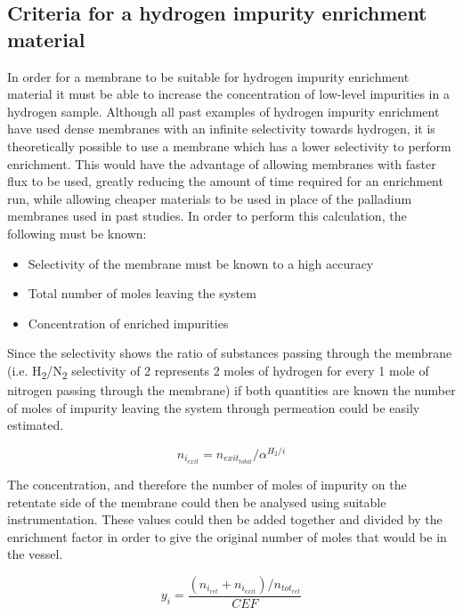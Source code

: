 \subsection{Criteria for a hydrogen impurity enrichment material}
In order for a membrane to be suitable for hydrogen impurity enrichment material it must be able to 
increase the concentration of low-level impurities in a hydrogen sample. 
Although all past examples of hydrogen impurity enrichment have used dense membranes with an infinite 
selectivity towards hydrogen, it is theoretically possible to use a membrane which has a lower selectivity 
to perform enrichment. This would have the advantage of allowing membranes with faster flux to be used, 
greatly reducing the amount of time required for an enrichment run, while allowing cheaper materials to be 
used in place of the palladium membranes used in past studies. In order to perform this calculation, 
the following must be known:
\begin{itemize}
\item Selectivity of the membrane must be known to a high accuracy
\item Total number of moles leaving the system
\item Concentration of enriched impurities
\end{itemize}

Since the selectivity shows the ratio of substances passing through the membrane 
(i.e. H\textsubscript{2}/N\textsubscript{2} selectivity of 2 represents 2 moles of hydrogen for every 1 mole 
of nitrogen passing through 
the membrane) if both quantities are known the number of moles of impurity leaving the system through 
permeation could be easily estimated.

\begin{equation}
    n_{i_{exit}} = n_{exit_{total}}/ \alpha^{H_2 /i}    
\end{equation}

The concentration, and therefore the number of moles of impurity on the retentate side of the membrane 
could then be analysed using suitable instrumentation. These values could then be added together and 
divided by the enrichment factor in order to give the original number of moles that would be in the vessel.

\begin{equation}
    y_i=\frac{(n_{i_{ret}}+n_{i_{exit}})/n_{tot_{ret}}}{CEF} 
\end{equation}


